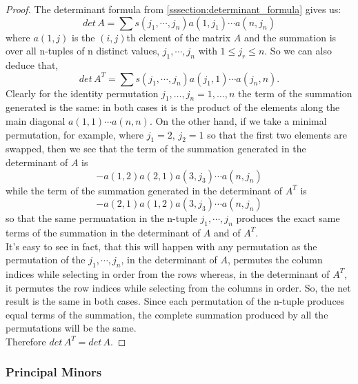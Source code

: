 \documentclass[../MathsNotesBase.tex]{subfiles}
\begin{document}
{		\bigskip
		\begin{proof}
			The determinant formula from \ref{sssection:determinant_formula} gives us:
			\[ det\, A = \sum s(j_1,\cdots,j_n)a(1,j_1) \cdots a(n,j_n) \]
			where $a(1,j)$ is the $(i,j)$th element of the matrix $A$ and the summation is over all n-tuples of n distinct values, $j_1, \cdots, j_n$ with ${1 \leq j_r \leq n}$. So we can also deduce that,
			\[ det\, A^T = \sum s(j_1,\cdots,j_n)a(j_1,1) \cdots a(j_n,n). \]
			Clearly for the identity permutation ${ j_1,\dots,j_n = 1,\dots,n }$ the term of the summation generated is the same: in both cases it is the product of the elements along the main diagonal ${ a(1,1)\cdots a(n,n) }$. On the other hand, if we take a minimal permutation, for example, where ${ j_1 = 2,\, j_2 = 1 }$ so that the first two elements are swapped, then we see that the term of the summation generated in the determinant of $A$ is
			\[ -a(1,2)a(2,1)a(3,j_3) \cdots a(n,j_n) \]
			while the term of the summation generated in the determinant of $A^T$ is
			\[ -a(2,1)a(1,2)a(3,j_3) \cdots a(n,j_n) \]
			so that the same permuatation in the n-tuple $j_1, \cdots, j_n$ produces the exact same terms of the summation in the determinant of $A$ and of $A^T$.\\
			It's easy to see in fact, that this will happen with any permutation as the permutation of the $j_1, \cdots, j_n$, in the determinant of $A$, permutes the column indices while selecting in order from the rows whereas, in the determinant of $A^T$, it permutes the row indices while selecting from the columns in order. So, the net result is the same in both cases. Since each permutation of the n-tuple produces equal terms of the summation, the complete summation produced by all the permutations will be the same.\\
			Therefore ${ det\,A^T = det\,A. }$
		\end{proof}
	
	
		
		\biggerskip
		\subsubsection{Principal Minors}
		\label{def:principal-minors}
	}
\end{document}

